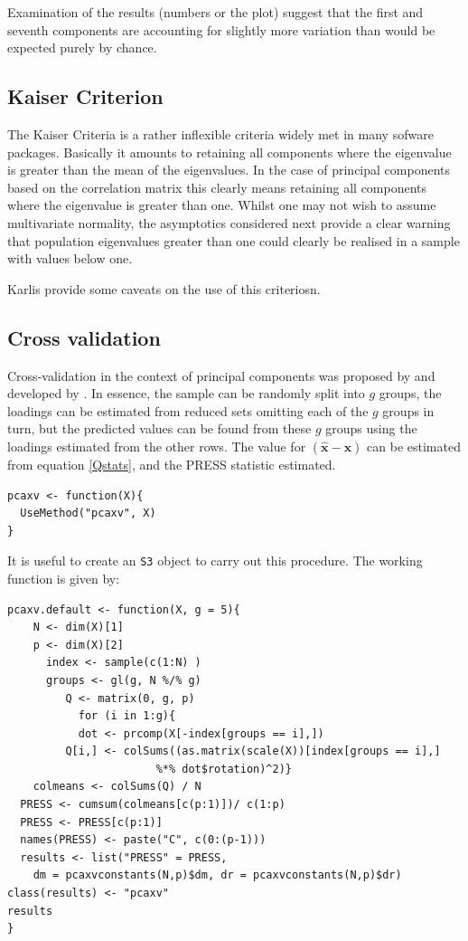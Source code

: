 Examination of the results (numbers or the plot) suggest that the first and seventh components are accounting for slightly more variation than would be expected purely by chance.

\subsection{Kaiser Criterion}
\label{kaiser}

The Kaiser Criteria is a rather inflexible criteria widely met in many sofware packages.   Basically it amounts to retaining all components where the eigenvalue is greater than the mean of the eigenvalues.   In the case of principal components based on the correlation matrix this clearly means retaining all components where the eigenvalue is greater than one.  Whilst one may not wish to assume multivariate normality, the asymptotics considered next provide a clear warning that population eigenvalues greater than one could clearly be realised in a sample with values below one.


Karlis provide some caveats on the use of this criteriosn.

\subsection{Cross validation}

Cross-validation in the context of principal components was proposed by \cite{Wold:1976,Wold:1978} and developed by \cite{Eastment+Krzanowski:1982}.   In essence, the sample can be randomly split into $g$ groups, the loadings can be estimated from reduced sets omitting each of the $g$ groups in turn, but the predicted values can be found from these $g$ groups using the loadings estimated from the other rows.   The value for $(\boldsymbol{\hat{x}} - \boldsymbol{x})$ can be estimated from equation \ref{Qstats}, and the PRESS statistic estimated.


\singlespacing
\begin{verbatim}
pcaxv <- function(X){
  UseMethod("pcaxv", X)
}
\end{verbatim}
\onehalfspacing

It is useful to create an \texttt{S3} object to carry out this procedure.   The working function is given by:

\singlespacing
\begin{verbatim}
pcaxv.default <- function(X, g = 5){
    N <- dim(X)[1]
    p <- dim(X)[2]
      index <- sample(c(1:N) )
      groups <- gl(g, N %/% g)
         Q <- matrix(0, g, p)
           for (i in 1:g){
           dot <- prcomp(X[-index[groups == i],])
         Q[i,] <- colSums((as.matrix(scale(X))[index[groups == i],]
                       %*% dot$rotation)^2)}
    colmeans <- colSums(Q) / N
  PRESS <- cumsum(colmeans[c(p:1)])/ c(1:p)
  PRESS <- PRESS[c(p:1)]
  names(PRESS) <- paste("C", c(0:(p-1)))
  results <- list("PRESS" = PRESS, 
    dm = pcaxvconstants(N,p)$dm, dr = pcaxvconstants(N,p)$dr)
class(results) <- "pcaxv"
results
}
\end{verbatim}
\onehalfspacing

